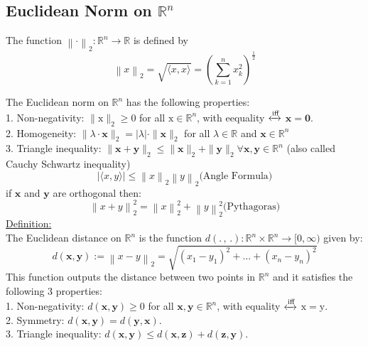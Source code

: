 \documentclass[a4paper,11pt]{article}
\renewcommand{\iff}{
  \xleftrightarrow{\text{iff}}
}
\newcommand{\bk}[1]{
  \langle {#1} \rangle
}
\renewcommand{\mod}[1]{
  \left\lVert {#1}\right\rVert_2
}
\newcommand{\abs}[1]{
  \left\lvert {#1} \right\rvert
}
\begin{document}
\subsection{Euclidean Norm on $ \mathbb{R}^n $}
The function $\mod{\cdot} : \mathbb{R}^n \to \mathbb{R} $ is defined by
$$ \mod{x} = \sqrt{\bk{x,x}} = \left(\sum_{k = 1}^{n} x^2_k\right)^{\frac{1}{2}}$$

The Euclidean norm on $\mathbb{R}^n$ has the following properties: \\
1. Non-negativity: $\|\mathrm{x}\|_2 \geqslant 0$ for all $\mathrm{x} \in \mathbb{R}^n$, with eequality $ \iff$ $\mathbf{x}=\mathbf{0}$. \\
2. Homogeneity: $\|\lambda \cdot \mathbf{x}\|_2=|\lambda| \cdot\|\mathbf{x}\|_2$ for all $\lambda \in \mathbb{R}$ and $\mathbf{x} \in \mathbb{R}^n$ \\
3. Triangle inequality: $\|\mathbf{x}+\mathbf{y}\|_2 \leqslant\|\mathbf{x}\|_2+\|\mathbf{y}\|_2 \forall \mathbf{x}, \mathbf{y} \in \mathbb{R}^n$ (also called Cauchy Schwartz inequality)\\
$$ \abs{\bk{x,y}} \leq \mod{x} \mod{y} \text{(Angle Formula)} $$
if $\mathbf{x}$ and $\mathbf{y}$ are orthogonal then:
$$ \mod{x+y}^2 = \mod{x}^2 + \mod{y}^2 \text{(Pythagoras)} $$
\underline{Definition:} \\
The Euclidean distance on $\mathbb{R}^n$ is the function $d(. \, , \, . ) : \mathbb{R}^n \times \mathbb{R}^n \to [0,\infty) $ given by:
$$ d(\mathbf{x}, \mathbf{y}):=\mod{x-y}=\sqrt{\left(x_1-y_1\right)^2+\ldots+\left(x_n-y_n\right)^2} $$
This function outputs the distance between two points in $\mathbb{R}^n$ and it satisfies the following 3 properties: \\
1. Non-negativity: $d(\mathbf{x}, \mathbf{y}) \geqslant 0$ for all $\mathbf{x}, \mathbf{y} \in \mathbb{R}^n$, with equality $\iff $ $\mathrm{x}=\mathrm{y}$. \\
2. Symmetry: $d(\mathbf{x}, \mathbf{y})=d(\mathbf{y}, \mathbf{x})$. \\
3. Triangle inequality: $d(\mathbf{x}, \mathbf{y}) \leqslant d(\mathbf{x}, \mathbf{z})+d(\mathbf{z}, \mathbf{y})$. \\
\end{document}
